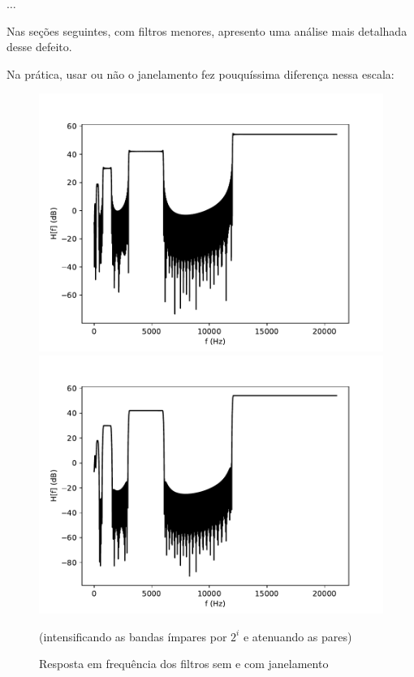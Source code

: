 \begin{center}
    $\dots$
\end{center}

Nas seções seguintes, com filtros menores, apresento uma análise mais detalhada desse defeito.

Na prática, usar ou não o janelamento fez pouquíssima diferença nessa escala:
\begin{figure}[H]
        \centering
        \includegraphics[scale=0.4]{fig/nowindow_stair.pdf}
    \endminipage
        \centering
        \includegraphics[scale=0.4]{fig/windowed_stair.pdf}
        \endminipage
    \begin{center}
        \caption{Resposta em frequência dos filtros sem e com janelamento}
        \small{(intensificando as bandas ímpares por $2^i$ e atenuando as pares)}
        \label{fig:stair window 1000}
    \end{center}
\end{figure}

